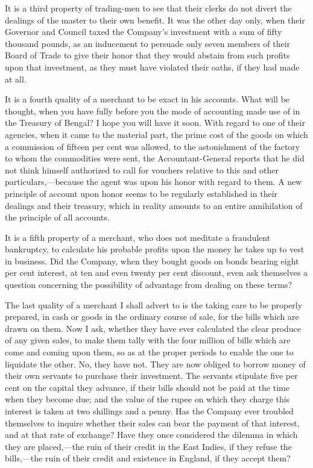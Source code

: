 It is a third property of trading-men to see that their clerks do not divert the dealings of the master to their own benefit. It was the other day only, when their Governor and Council taxed the Company's investment with a sum of fifty thousand pounds, as an inducement to persuade only seven members of their Board of Trade to give their honor that they would abstain from such profits upon that investment, as they must have violated their oaths, if they had made at all.

It is a fourth quality of a merchant to be exact in his accounts. What will be thought, when you have fully before you the mode of accounting made use of in the Treasury of Bengal? I hope you will have it soon. With regard to one of their agencies, when it came to the material part, the prime cost of the goods on which a commission of fifteen per cent was allowed, to the astonishment of the factory to whom the commodities were sent, the Accountant-General reports that he did not think himself authorized to call for vouchers relative to this and other particulars,—because the agent was upon his honor with regard to them. A new principle of account upon honor seems to be regularly established in their dealings and their treasury, which in reality amounts to an entire annihilation of the principle of all accounts.

It is a fifth property of a merchant, who does not meditate a fraudulent bankruptcy, to calculate his probable profits upon the money he takes up to vest in business. Did the Company, when they bought goods on bonds bearing eight per cent interest, at ten and even twenty per cent discount, even ask themselves a question concerning the possibility of advantage from dealing on these terms?

The last quality of a merchant I shall advert to is the taking care to be properly prepared, in cash or goods in the ordinary course of sale, for the bills which are drawn on them. Now I ask, whether they have ever calculated the clear produce of any given sales, to make them tally with the four million of bills which are come and coming upon them, so as at the proper periods to enable the one to liquidate the other. No, they have not. They are now obliged to borrow money of their own servants to purchase their investment. The servants stipulate five per cent on the capital they advance, if their bills should not be paid at the time when they become due; and the value of the rupee on which they charge this interest is taken at two shillings and a penny. Has the Company ever troubled themselves to inquire whether their sales can bear the payment of that interest, and at that rate of exchange? Have they once considered the dilemma in which they are placed,—the ruin of their credit in the East Indies, if they refuse the bills,—the ruin of their credit and existence in England, if they accept them?


